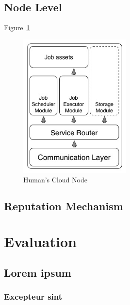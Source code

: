 \documentclass{./llncs2e/llncs}
\begin{document}
\subsection{Node Level}
Figure~\ref{fig:hcnode}

\begin{figure}[h!]
  \centering
  \includegraphics[width=0.5\textwidth]{img/node.jpg}
  \caption{Human's Cloud Node}
  \label{fig:hcnode}
\end{figure}

\subsection{Reputation Mechanism}






% 
% 

\section{Evaluation}

\subsection{Lorem ipsum}

\subsubsection{Excepteur sint}
\end{document}
